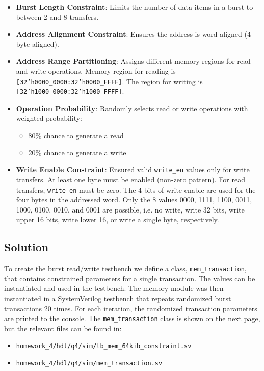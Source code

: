\documentclass[../main.tex]{subfiles}
\begin{document}
\begin{itemize}
    \item \textbf{Burst Length Constraint}: Limits the number of data items in a burst to between 2 and 8 transfers.
    \item \textbf{Address Alignment Constraint}: Ensures the address is word-aligned (4-byte aligned).
    \item \textbf{Address Range Partitioning}: Assigns different memory regions for read and write operations. Memory region for reading is \texttt{[32'h0000\_0000:32'h0000\_FFFF]}. The region for writing is \texttt{[32'h1000\_0000:32'h1000\_FFFF]}.
    \item \textbf{Operation Probability}: Randomly selects read or write operations with weighted probability:
    \begin{itemize}
        \item 80\% chance to generate a read
        \item 20\% chance to generate a write
    \end{itemize}
    \item \textbf{Write Enable Constraint}: Ensured valid \texttt{write\_en} values only for write transfers. At least one byte must be enabled (non-zero pattern). For read transfers, \texttt{write\_en} must be zero. The 4 bits of write enable are used for the four bytes in the addressed word. Only the 8 values 0000, 1111, 1100, 0011, 1000, 0100, 0010, and 0001 are possible, i.e. no write, write 32 bits, write upper 16 bits, write lower 16, or write a single byte, respectively.
\end{itemize}

\subsection*{Solution}

To create the burst read/write testbench we define a class, \texttt{mem\_transaction}, that contains constrained parameters for a single transaction. The values can be instantiated and used in the testbench. The memory module was then instantiated in a SystemVerilog testbench that repeats randomized burst transactions 20 times. For each iteration, the randomized transaction parameters are printed to the console. The \texttt{mem\_transaction} class is shown on the next page, but the relevant files can be found in:

\begin{itemize}
    \item \texttt{homework\_4/hdl/q4/sim/tb\_mem\_64kib\_constraint.sv}
    \item \texttt{homework\_4/hdl/q4/sim/mem\_transaction.sv}
\end{itemize}
\end{document}
